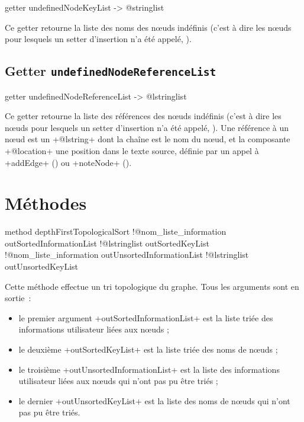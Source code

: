 \begin{galgas3}
getter undefinedNodeKeyList -> @stringlist
\end{galgas3}

Ce getter retourne la liste des noms des nœuds indéfinis (c'est à dire les nœuds pour lesquels un setter d'insertion n'a été appelé, ).








\subsection{Getter \texttt{undefinedNodeReferenceList}}

\begin{galgas3}
getter undefinedNodeReferenceList -> @lstringlist
\end{galgas3}

Ce getter retourne la liste des références des nœuds indéfinis (c'est à dire les nœuds pour lesquels un setter d'insertion n'a été appelé, ). Une référence à un nœud est un \ggst+@lstring+ dont la chaîne est le nom du nœud, et la composante \ggst+@location+ une position dans le texte source, définie par un appel à \ggst+addEdge+ () ou \ggst+noteNode+ ().




\section{Méthodes}


\begin{galgas3}
method depthFirstTopologicalSort
  !@nom_liste_information outSortedInformationList
  !@lstringlist outSortedKeyList
  !@nom_liste_information outUnsortedInformationList
  !@lstringlist outUnsortedKeyList
\end{galgas3}

Cette méthode effectue un tri topologique du graphe. Tous les arguments sont en sortie~:
\begin{itemize}
  \item le premier argument \ggst+outSortedInformationList+ est la liste triée des informations utilisateur liées aux nœuds ;
  \item le deuxième \ggst+outSortedKeyList+ est la liste triée des noms de nœuds ;
  \item le troisième \ggst+outUnsortedInformationList+ est la liste des informations utilisateur liées aux nœuds qui n'ont pas pu être triés ;
  \item le dernier \ggst+outUnsortedKeyList+ est la liste des noms de nœuds qui n'ont pas pu être triés.
\end{itemize}

